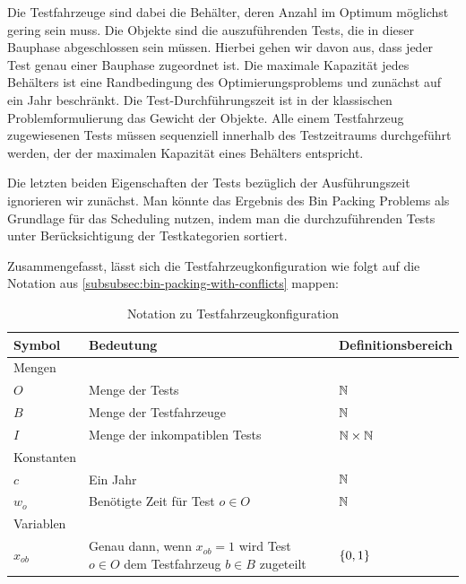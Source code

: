 Die Testfahrzeuge sind dabei die Behälter, deren Anzahl im Optimum möglichst gering sein muss.
Die Objekte sind die auszuführenden Tests, die in dieser Bauphase abgeschlossen sein müssen.
Hierbei gehen wir davon aus, dass jeder Test genau einer Bauphase zugeordnet ist. Die maximale
Kapazität jedes Behälters ist eine Randbedingung des Optimierungsproblems und zunächst auf ein
Jahr beschränkt.
Die Test-Durchführungszeit ist in der klassischen Problemformulierung das Gewicht der Objekte.
Alle einem Testfahrzeug zugewiesenen Tests müssen sequenziell innerhalb des Testzeitraums
durchgeführt werden, der der maximalen Kapazität eines Behälters entspricht.

Die letzten beiden Eigenschaften der Tests bezüglich der Ausführungszeit ignorieren wir zunächst.
Man könnte das Ergebnis des Bin Packing Problems als Grundlage für das Scheduling nutzen, indem
man die durchzuführenden Tests unter Berücksichtigung der Testkategorien sortiert.

Zusammengefasst, lässt sich die Testfahrzeugkonfiguration wie folgt auf die Notation aus
\cref{subsubsec:bin-packing-with-conflicts} mappen:
\begin{table}[H]
    \begin{tabularx}{\textwidth}{  l | X | l }
    Symbol & Bedeutung & Definitionsbereich \\\hline\hline
    Mengen & & \\\hline\hline
    $O$ & Menge der Tests & $\mathbb{N}$\\\hline
    $B$ & Menge der Testfahrzeuge & $\mathbb{N}$\\\hline
    $I$ & Menge der inkompatiblen Tests & $\mathbb{N}\times\mathbb{N}$\\\hline\hline
    Konstanten &  &  \\\hline\hline
    $c$ & Ein Jahr & $\mathbb{N}$\\\hline
    $w_o$ & Benötigte Zeit für Test $o\in O$ & $\mathbb{N}$\\\hline\hline
    Variablen &  &  \\\hline\hline
    $x_{ob}$ & Genau dann, wenn $x_{ob}=1$ wird Test $o\in O$ dem Testfahrzeug $b\in B$ zugeteilt & $\{0,1\}$\\\hline
    \end{tabularx}
    \caption{Notation zu Testfahrzeugkonfiguration}\label{tab:notation_test_vehicle}
\end{table}
